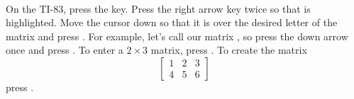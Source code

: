 \contributedby{\dougphelps}\\
On the TI-83, press the  key.  Press the right arrow key twice so that  is highlighted.  Move the cursor down so that it is over the desired letter of the matrix and press .  For example, let's call our matrix , so press the down arrow once and press .  To enter a $2\times 3$ matrix, press .  To create the matrix
%
\begin{equation*}
\begin{bmatrix}
1&2&3\\4&5&6
\end{bmatrix}
\end{equation*}
%
press .
